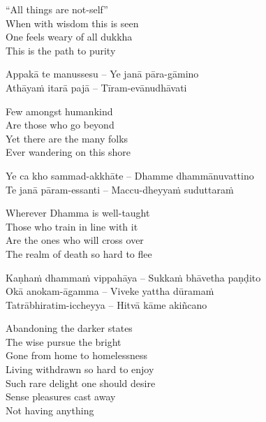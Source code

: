 \begin{english}
  “All things are not-self”\\
  When with wisdom this is seen\\
  One feels weary of all dukkha\\
  This is the path to purity
\end{english}

\suttaRef{[Dhp 183-185]}

\begin{twochants}
  Appakā te manussesu – Ye janā pāra-gāmino\\
  Athāyaṁ itarā pajā – Tīram-evānudhāvati\\
\end{twochants}

\begin{english}
  Few amongst humankind\\
  Are those who go beyond\\
  Yet there are the many folks\\
  Ever wandering on this shore
\end{english}

\begin{twochants}
  Ye ca kho sammad-akkhāte – Dhamme dhammānuvattino\\
  Te janā pāram-essanti – Maccu-dheyyaṁ suduttaraṁ\\
\end{twochants}

\begin{english}
  Wherever Dhamma is well-taught\\
  Those who train in line with it\\
  Are the ones who will cross over\\
  The realm of death so hard to flee
\end{english}

\begin{twochants}
  Kaṇhaṁ dhammaṁ vippahāya – Sukkaṁ bhāvetha paṇḍito\\
  Okā anokam-āgamma – Viveke yattha dūramaṁ\\
  Tatrābhiratim-iccheyya – Hitvā kāme akiñcano
\end{twochants}

\begin{english}
  Abandoning the darker states\\
  The wise pursue the bright\\
  Gone from home to homelessness\\
  Living withdrawn so hard to enjoy\\
  Such rare delight one should desire\\
  Sense pleasures cast away\\
  Not having anything
\end{english}

